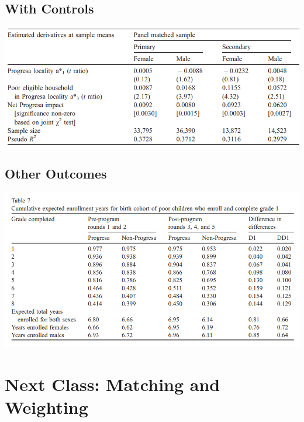 \documentclass[
  letterpaper,
  DIV=11,
  numbers=noendperiod]{scrartcl}
\begin{document}
\hypertarget{with-controls}{%
\subsection{With Controls}\label{with-controls}}

\includegraphics{./po_ci_files/fig6.png}

\hypertarget{other-outcomes}{%
\subsection{Other Outcomes}\label{other-outcomes}}

\includegraphics{./po_ci_files/fig5.png}

\hypertarget{next-class-matching-and-weighting}{%
\section{Next Class: Matching and
Weighting}\label{next-class-matching-and-weighting}}
\end{document}
